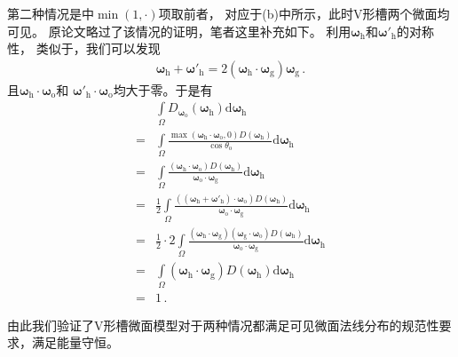 第二种情况是中$\min(1,\cdot)$项取前者，
对应于(b)中所示，此时V形槽两个微面均可见。
原论文略过了该情况的证明，笔者这里补充如下。
利用${\bm\omega}_{\mathrm{h}}$和${\bm\omega}'_{\mathrm{h}}$的对称性，
类似于，我们可以发现
\begin{align}
    {\bm\omega}_{\mathrm{h}}+{\bm\omega}'_{\mathrm{h}}
    =2({\bm\omega}_{\mathrm{h}}\cdot{\bm\omega}_{\mathrm{g}}){\bm\omega}_{\mathrm{g}}\, .
\end{align}
且${\bm\omega}_{\mathrm{h}}\cdot{\bm\omega}_{\mathrm{o}}$和
${\bm\omega}'_{\mathrm{h}}\cdot{\bm\omega}_{\mathrm{o}}$均大于零。于是有
\begin{align}
      & \int\limits_{\varOmega}D_{{\bm\omega}_{\mathrm{o}}}({\bm\omega}_{\mathrm{h}})
    \mathrm{d}{\bm\omega}_{\mathrm{h}}\nonumber                                                                                     \\
    = & \int\limits_{\varOmega}\frac{\max({\bm\omega}_{\mathrm{h}}\cdot{\bm\omega}_{\mathrm{o}},0)
        D({\bm\omega}_{\mathrm{h}})}{\cos\theta_{\mathrm{o}}}\mathrm{d}{\bm\omega}_{\mathrm{h}}\nonumber                            \\
    = & \int\limits_{\varOmega}\frac{({\bm\omega}_{\mathrm{h}}\cdot{\bm\omega}_{\mathrm{o}})
    D({\bm\omega}_{\mathrm{h}})}{{\bm\omega}_{\mathrm{o}}\cdot{\bm\omega}_{\mathrm{g}}}\mathrm{d}{\bm\omega}_{\mathrm{h}}\nonumber  \\
    = & \frac{1}{2}\int\limits_{\varOmega}\frac{(({\bm\omega}_{\mathrm{h}}+{\bm\omega}'_{\mathrm{h}})\cdot{\bm\omega}_{\mathrm{o}})
    D({\bm\omega}_{\mathrm{h}})}{{\bm\omega}_{\mathrm{o}}\cdot{\bm\omega}_{\mathrm{g}}}\mathrm{d}{\bm\omega}_{\mathrm{h}}\nonumber  \\
    = & \frac{1}{2}\cdot2\int\limits_{\varOmega}\frac{({\bm\omega}_{\mathrm{h}}\cdot{\bm\omega}_{\mathrm{g}})
    ({\bm\omega}_{\mathrm{g}}\cdot{\bm\omega}_{\mathrm{o}})
    D({\bm\omega}_{\mathrm{h}})}{{\bm\omega}_{\mathrm{o}}\cdot{\bm\omega}_{\mathrm{g}}}\mathrm{d}{\bm\omega}_{\mathrm{h}}\nonumber  \\
    = & \int\limits_{\varOmega}({\bm\omega}_{\mathrm{h}}\cdot{\bm\omega}_{\mathrm{g}})
    D({\bm\omega}_{\mathrm{h}})\mathrm{d}{\bm\omega}_{\mathrm{h}}\nonumber                                                          \\
    = & 1\, .
\end{align}

由此我们验证了V形槽微面模型对于两种情况都满足可见微面法线分布的规范性要求，满足能量守恒。

